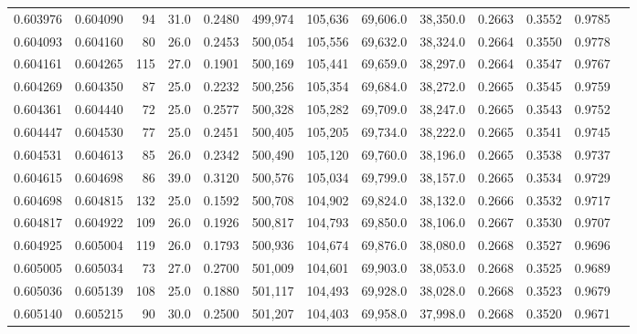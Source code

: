 \begin{tabular}{rrrrrrrrrrrrr}
0.603976 & 0.604090 &    94 & 31.0 &                                     0.2480 & 499,974 & 105,636 &  69,606.0 &  38,350.0 & 0.2663 & 0.3552 & 0.9785 \\
0.604093 & 0.604160 &    80 & 26.0 &                                     0.2453 & 500,054 & 105,556 &  69,632.0 &  38,324.0 & 0.2664 & 0.3550 & 0.9778 \\
0.604161 & 0.604265 &   115 & 27.0 &                                     0.1901 & 500,169 & 105,441 &  69,659.0 &  38,297.0 & 0.2664 & 0.3547 & 0.9767 \\
0.604269 & 0.604350 &    87 & 25.0 &                                     0.2232 & 500,256 & 105,354 &  69,684.0 &  38,272.0 & 0.2665 & 0.3545 & 0.9759 \\
0.604361 & 0.604440 &    72 & 25.0 &                                     0.2577 & 500,328 & 105,282 &  69,709.0 &  38,247.0 & 0.2665 & 0.3543 & 0.9752 \\
0.604447 & 0.604530 &    77 & 25.0 &                                     0.2451 & 500,405 & 105,205 &  69,734.0 &  38,222.0 & 0.2665 & 0.3541 & 0.9745 \\
0.604531 & 0.604613 &    85 & 26.0 &                                     0.2342 & 500,490 & 105,120 &  69,760.0 &  38,196.0 & 0.2665 & 0.3538 & 0.9737 \\
0.604615 & 0.604698 &    86 & 39.0 &                                     0.3120 & 500,576 & 105,034 &  69,799.0 &  38,157.0 & 0.2665 & 0.3534 & 0.9729 \\
0.604698 & 0.604815 &   132 & 25.0 &                                     0.1592 & 500,708 & 104,902 &  69,824.0 &  38,132.0 & 0.2666 & 0.3532 & 0.9717 \\
0.604817 & 0.604922 &   109 & 26.0 &                                     0.1926 & 500,817 & 104,793 &  69,850.0 &  38,106.0 & 0.2667 & 0.3530 & 0.9707 \\
0.604925 & 0.605004 &   119 & 26.0 &                                     0.1793 & 500,936 & 104,674 &  69,876.0 &  38,080.0 & 0.2668 & 0.3527 & 0.9696 \\
0.605005 & 0.605034 &    73 & 27.0 &                                     0.2700 & 501,009 & 104,601 &  69,903.0 &  38,053.0 & 0.2668 & 0.3525 & 0.9689 \\
0.605036 & 0.605139 &   108 & 25.0 &                                     0.1880 & 501,117 & 104,493 &  69,928.0 &  38,028.0 & 0.2668 & 0.3523 & 0.9679 \\
0.605140 & 0.605215 &    90 & 30.0 &                                     0.2500 & 501,207 & 104,403 &  69,958.0 &  37,998.0 & 0.2668 & 0.3520 & 0.9671 \\

\end{tabular}
